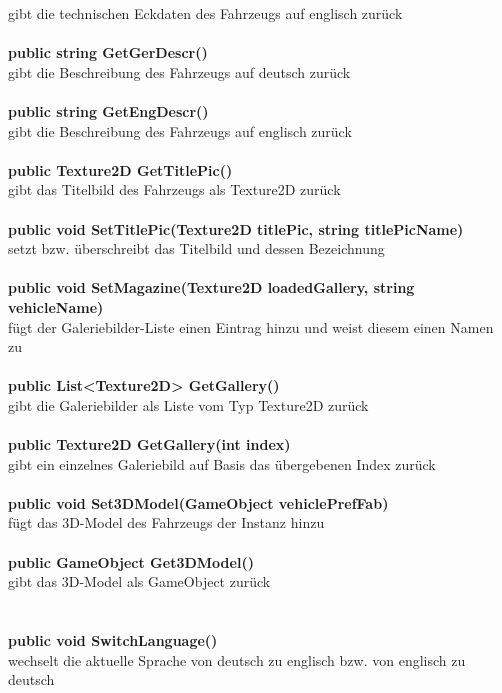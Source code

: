 gibt die technischen Eckdaten des Fahrzeugs auf englisch zurück\\
\\
\textbf{public string GetGerDescr()}\\
gibt die Beschreibung des Fahrzeugs auf deutsch zurück\\
\\
\textbf{public string GetEngDescr()}\\
gibt die Beschreibung des Fahrzeugs auf englisch zurück\\
\\
\textbf{public Texture2D GetTitlePic()}\\
gibt das Titelbild des Fahrzeugs als Texture2D zurück\\
\\
\textbf{public void SetTitlePic(Texture2D titlePic, string titlePicName)}\\
setzt bzw. überschreibt das Titelbild und dessen Bezeichnung\\
\\
\textbf{public void SetMagazine(Texture2D loadedGallery, string vehicleName)}\\
fügt der Galeriebilder-Liste einen Eintrag hinzu und weist diesem einen Namen zu\\
\\
\textbf{public List<Texture2D> GetGallery()}\\
gibt die Galeriebilder als Liste vom Typ Texture2D zurück\\
\\
\textbf{public Texture2D GetGallery(int index)}\\
gibt ein einzelnes Galeriebild auf Basis das übergebenen Index zurück\\
\\
\textbf{public void Set3DModel(GameObject vehiclePrefFab)}\\
fügt das 3D-Model des Fahrzeugs der Instanz hinzu\\
\\
\textbf{public GameObject Get3DModel()}\\
gibt das 3D-Model als GameObject zurück\\
%
\section{\lsc}
\label{sec:lsc}
%
\textbf{public void SwitchLanguage()}\\
wechselt die aktuelle Sprache von deutsch zu englisch bzw. von englisch zu deutsch\\
%
